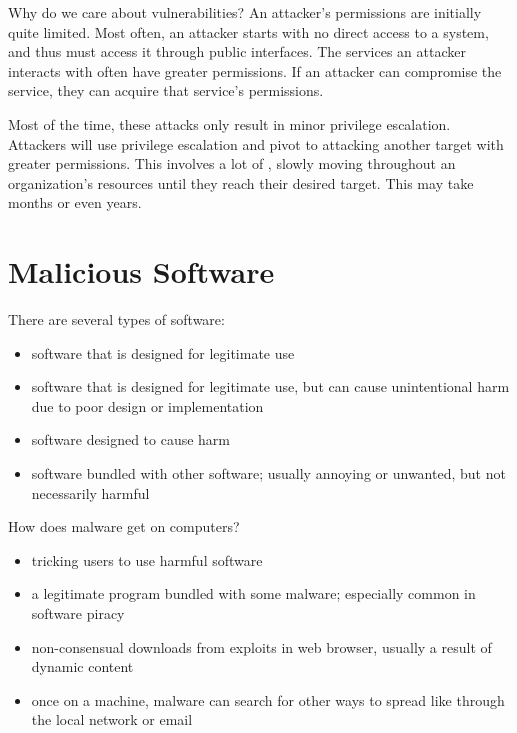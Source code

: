 Why do we care about vulnerabilities? An attacker's permissions are initially quite limited. Most often, an attacker starts with no direct access to a system, and thus must access it through public interfaces. The services an attacker interacts with often have greater permissions. If an attacker can compromise the service, they can acquire that service's permissions.

Most of the time, these attacks only result in minor privilege escalation. Attackers will use privilege escalation and pivot to attacking another target with greater permissions. This involves a lot of , slowly moving throughout an organization's resources until they reach their desired target. This may take months or even years.

\section{Malicious Software}

There are several types of software:
\begin{itemize}[noitemsep]
    \item {} software that is designed for legitimate use
    \item {} software that is designed for legitimate use, but can cause unintentional harm due to poor design or implementation
    \item {} software designed to cause harm
    \item {} software bundled with other software; usually annoying or unwanted, but not necessarily harmful
\end{itemize}

How does malware get on computers?
\begin{itemize}[noitemsep]
    \item {} tricking users to use harmful software
    \item {} a legitimate program bundled with some malware; especially common in software piracy
    \item {} non-consensual downloads from exploits in web browser, usually a result of dynamic content
    \item {} once on a machine, malware can search for other ways to spread like through the local network or email
\end{itemize}


